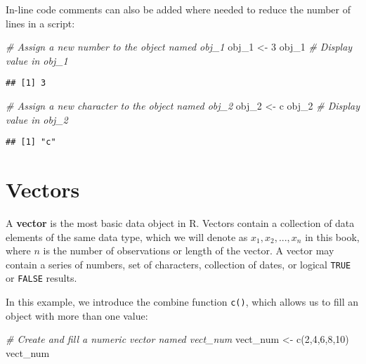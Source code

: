 \documentclass[
]{book}
\newenvironment{Shaded}{\begin{snugshade}}{\end{snugshade}}
\newcommand{\CommentTok}[1]{\textcolor[rgb]{0.56,0.35,0.01}{\textit{#1}}}
\newcommand{\DecValTok}[1]{\textcolor[rgb]{0.00,0.00,0.81}{#1}}
\newcommand{\FunctionTok}[1]{\textcolor[rgb]{0.00,0.00,0.00}{#1}}
\newcommand{\NormalTok}[1]{#1}
\newcommand{\OtherTok}[1]{\textcolor[rgb]{0.56,0.35,0.01}{#1}}
\newcommand{\StringTok}[1]{\textcolor[rgb]{0.31,0.60,0.02}{#1}}
\begin{document}
In-line code comments can also be added where needed to reduce the number of lines in a script:

\begin{Shaded}
\begin{Highlighting}[]
\CommentTok{\# Assign a new number to the object named obj\_1}
\NormalTok{obj\_1 }\OtherTok{\textless{}{-}} \DecValTok{3}
\NormalTok{obj\_1 }\CommentTok{\# Display value in obj\_1}
\end{Highlighting}
\end{Shaded}

\begin{verbatim}
## [1] 3
\end{verbatim}

\begin{Shaded}
\begin{Highlighting}[]
\CommentTok{\# Assign a new character to the object named obj\_2}
\NormalTok{obj\_2 }\OtherTok{\textless{}{-}} \StringTok{\textquotesingle{}c\textquotesingle{}} 
\NormalTok{obj\_2 }\CommentTok{\# Display value in obj\_2}
\end{Highlighting}
\end{Shaded}

\begin{verbatim}
## [1] "c"
\end{verbatim}

\hypertarget{vectors}{%
\section{Vectors}\label{vectors}}

A \textbf{vector} is the most basic data object in R. Vectors contain a collection of data elements of the same data type, which we will denote as \(x_1, x_2, ..., x_n\) in this book, where \(n\) is the number of observations or length of the vector. A vector may contain a series of numbers, set of characters, collection of dates, or logical \texttt{TRUE} or \texttt{FALSE} results.

In this example, we introduce the combine function \texttt{c()}, which allows us to fill an object with more than one value:

\begin{Shaded}
\begin{Highlighting}[]
\CommentTok{\# Create and fill a numeric vector named vect\_num}
\NormalTok{vect\_num }\OtherTok{\textless{}{-}} \FunctionTok{c}\NormalTok{(}\DecValTok{2}\NormalTok{,}\DecValTok{4}\NormalTok{,}\DecValTok{6}\NormalTok{,}\DecValTok{8}\NormalTok{,}\DecValTok{10}\NormalTok{)}
\NormalTok{vect\_num}
\end{Highlighting}
\end{Shaded}
\end{document}
